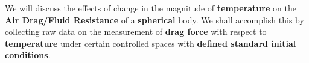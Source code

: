 {We will discuss the effects of change in the magnitude of \textbf{temperature} on the \textbf{Air Drag/Fluid Resistance} of a \textbf{spherical} body. We shall accomplish this by collecting raw data on the measurement of \textbf{drag force} with respect to \textbf{temperature} under certain controlled spaces with \textbf{defined standard initial conditions}.}
